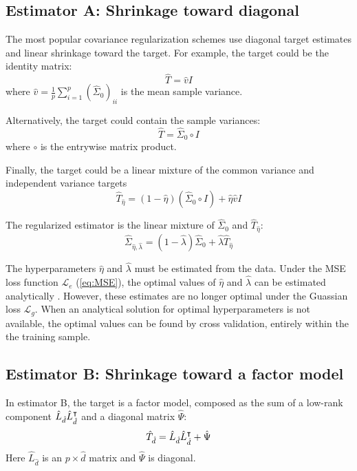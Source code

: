 \subsection{Estimator A: Shrinkage toward diagonal}
The most popular covariance regularization schemes use diagonal target estimates and linear shrinkage toward the target.  For example, the target could be the identity matrix:  
\begin{equation}
\hat T = \hat v I
\end{equation}
where $\hat v = \frac 1 p \sum\limits_{i=1}^p(\hat\Sigma_0)_{ii}$ is the mean sample variance. 

Alternatively, the target could contain the sample variances:
\begin{equation}
\hat T= \hat\Sigma_0 \circ I 
\end{equation}
where $\circ$ is the entrywise matrix product.

Finally, the target could be a linear mixture of the common variance and independent variance targets
\begin{equation}
\hat T_{\hat\eta} = (1-\hat\eta)(\hat\Sigma_0 \circ I) + \hat\eta\hat v I
\end{equation}

The regularized estimator is the linear mixture of $\hat\Sigma_0$ and $\hat T_{\hat\eta}$:
\begin{equation}
\hat\Sigma_{\hat\eta,\hat\lambda} = (1-\hat\lambda)\hat\Sigma_0 + \hat\lambda \hat T_{\hat\eta} 
\end{equation}

The hyperparameters $\hat\eta$ and $\hat\lambda$ must be estimated from the data.  Under the MSE loss function $\mathcal L_e$ (\autoref{eq:MSE}), the optimal values of $\hat\eta$ and $\hat\lambda$ can be estimated analytically \citep{Ledoit:2004,Schafer:2005,Schaefer:2010}. However, these estimates are no longer optimal under the Guassian loss $\mathcal L_g$.   When an analytical solution for optimal hyperparameters is not available, the optimal values can be found by cross validation, entirely within the the training sample. 


\subsection{Estimator B: Shrinkage toward a factor model}
In estimator B, the target is a factor model, composed as the sum of a low-rank component $\hat L_{\hat d}\hat L_{\hat d}^\intercal$ and a diagonal matrix $\hat \Psi$:
\begin{equation}
\hat T_{\hat d} = \hat L_{\hat d} \hat L_{\hat d}^\intercal + \hat\Psi
\end{equation}
Here $\hat L_{\hat d}$ is an $p\times\hat d$ matrix and $\hat\Psi$ is diagonal.  

